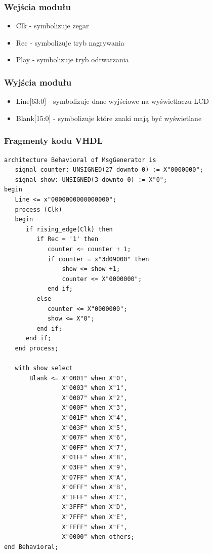 \documentclass[a4paper,11pt]{article}
\begin{document}
\subsubsection*{Wejścia modułu}
\begin{itemize}
\item Clk - symbolizuje zegar
\item Rec - symbolizuje tryb nagrywania
\item Play - symbolizuje tryb odtwarzania
\end{itemize}

\subsubsection*{Wyjścia modułu}
\begin{itemize}
\item Line[63:0] - symbolizuje dane wyjściowe na wyświetlaczu LCD
\item Blank[15:0] - symbolizuje które znaki mają być wyświetlane
\end{itemize}

\subsubsection*{Fragmenty kodu VHDL}
\begin{lstlisting}[caption=Procesy modułu MsgGenerator.]
architecture Behavioral of MsgGenerator is
   signal counter: UNSIGNED(27 downto 0) := X"0000000";
   signal show: UNSIGNED(3 downto 0) := X"0";
begin
   Line <= x"0000000000000000";
   process (Clk)
   begin
      if rising_edge(Clk) then
         if Rec = '1' then
            counter <= counter + 1;
            if counter = x"3d09000" then
                show <= show +1;
                counter <= X"0000000";
            end if;
         else
            counter <= X"0000000";
            show <= X"0";
         end if;
      end if;
   end process;
   
   with show select
       Blank <= X"0001" when X"0",
                X"0003" when X"1",
                X"0007" when X"2",
                X"000F" when X"3",
                X"001F" when X"4",
                X"003F" when X"5",
                X"007F" when X"6",
                X"00FF" when X"7",
                X"01FF" when X"8",
                X"03FF" when X"9",
                X"07FF" when X"A",
                X"0FFF" when X"B",
                X"1FFF" when X"C",
                X"3FFF" when X"D",
                X"7FFF" when X"E",
                X"FFFF" when X"F",
                X"0000" when others;     
end Behavioral;
\end{lstlisting}
\end{document}
